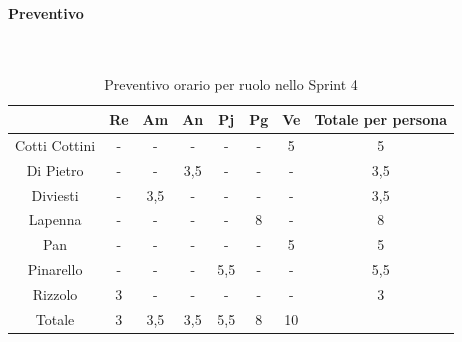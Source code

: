 \documentclass{article}
\begin{document}
                \paragraph{Preventivo}\mbox{}\\
                \begin{table}[H]
                    \centering
                    \begin{tabular}{|c|c|c|c|c|c|c|c|}
                    \hline
                                  & Re  & Am  & An  & Pj  & Pg  & Ve  & Totale per persona \\ \hline
                    Cotti Cottini & -   & -   & -   & -   & -   & 5   & 5                  \\ \hline
                    Di Pietro     & -   & -   & 3,5 & -   & -   & -   & 3,5                \\ \hline
                    Diviesti      & -   & 3,5 & -   & -   & -   & -   & 3,5                \\ \hline
                    Lapenna       & -   & -   & -   & -   & 8  & -   & 8                 \\ \hline
                    Pan           & -   & -   & -   & -   & -   & 5   & 5                  \\ \hline
                    Pinarello     & -   & -   & -   & 5,5 & -   & -   & 5,5                \\ \hline
                    Rizzolo       & 3   & -   & -   & -   & -   & -   & 3                  \\ \hline
                    Totale        & 3   & 3,5 & 3,5 & 5,5 & 8  & 10  &                    \\ \hline
                    \end{tabular}
                    \caption{Preventivo orario per ruolo nello Sprint 4}
                \end{table}

\end{document}
